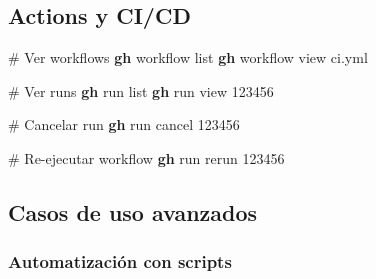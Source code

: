 \documentclass[
  11pt,
  letterpaper,
  oneside,
  openany]{scrbook}
\newenvironment{Shaded}{}{}
\newcommand{\CommentTok}[1]{\textcolor[rgb]{0.42,0.45,0.49}{#1}}
\newcommand{\ExtensionTok}[1]{\textcolor[rgb]{0.84,0.23,0.29}{\textbf{#1}}}
\newcommand{\NormalTok}[1]{\textcolor[rgb]{0.14,0.16,0.18}{#1}}
\begin{document}
\subsection{Actions y CI/CD}\label{actions-y-cicd}

\begin{Shaded}
\begin{Highlighting}[]
\CommentTok{\# Ver workflows}
\ExtensionTok{gh}\NormalTok{ workflow list}
\ExtensionTok{gh}\NormalTok{ workflow view ci.yml}

\CommentTok{\# Ver runs}
\ExtensionTok{gh}\NormalTok{ run list}
\ExtensionTok{gh}\NormalTok{ run view 123456}

\CommentTok{\# Cancelar run}
\ExtensionTok{gh}\NormalTok{ run cancel 123456}

\CommentTok{\# Re{-}ejecutar workflow}
\ExtensionTok{gh}\NormalTok{ run rerun 123456}
\end{Highlighting}
\end{Shaded}

\subsection{Casos de uso avanzados}\label{casos-de-uso-avanzados-6}

\subsubsection{Automatización con
scripts}\label{automatizaciuxf3n-con-scripts}
\end{document}
